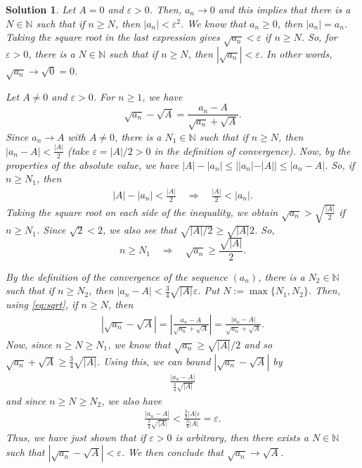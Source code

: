 \documentclass[12pt]{article}
\newcommand{\bN}{\mathbb{N}}
\newcommand{\ra}{\rightarrow}
\newcommand{\Ra}{\Rightarrow}
\theoremstyle{plain}
\theoremstyle{plain}
\newtheorem*{sol}{\textbf{Solution}}}
\theoremstyle{plain}
\theoremstyle{plain}
\begin{document}
\begin{sol}
Let $A= 0$ and $\varepsilon > 0$. Then, $a_n \ra 0$ and this implies that there is a $N \in \bN$ such that if $n \geq N$, then $|a_n| < \varepsilon^2$. We know that $a_n \geq 0$, then $|a_n| = a_n$. Taking the square root in the last expression gives $\sqrt{a_n} < \varepsilon$ if $n \geq N$. So, for $\varepsilon > 0$, there is a $N \in \bN$ such that if $n \geq N$, then $|\sqrt{a_n}| < \varepsilon$. In other words, $\sqrt{a_n} \ra \sqrt{0} = 0$.

Let $A \neq 0$ and $\varepsilon > 0$. For $n \geq 1$, we have
	\begin{equation}
	\sqrt{a_n} - \sqrt{A} = \frac{a_n - A}{\sqrt{a_n} + \sqrt{A}} .  \label{eq:sqrt}
	\end{equation}
Since $a_n \ra A$ with $A \neq 0$, there is a $N_1 \in \bN$ such that if $n \geq N$, then $|a_n - A| < \frac{|A|}{2}$ (take $\varepsilon = |A|/2 > 0$ in the definition of convergence). Now, by the properties of the absolute value, we have $|A| - |a_n| \leq ||a_n| - |A|| \leq |a_n - A|$. So, if $n \geq N_1$, then
	\begin{align*}
	|A| - |a_n| < \frac{|A|}{2} \quad \Ra \quad \frac{|A|}{2} < |a_n| .
	\end{align*}
Taking the square root on each side of the inequality, we obtain $\sqrt{a_n} > \sqrt{\frac{|A|}{2}}$ if $n \geq N_1$. Since $\sqrt{2} < 2$, we also see that $\sqrt{|A|/2} \geq \sqrt{|A|}{2}$. So, 
	\begin{equation}
	n \geq N_1 \quad \Ra \quad \sqrt{a_n} \geq \frac{\sqrt{|A|}}{2} . \label{eq:lowerbound}
	\end{equation}

By the definition of the convergence of the sequence $(a_n)$, there is a $N_2 \in \bN$ such that if $n \geq N_2$, then $|a_n - A| < \frac{3}{4} \sqrt{|A|} \varepsilon$. Put $N := \max \{ N_1 , N_2 \}$. Then, using \eqref{eq:sqrt}, if $n \geq N$, then
	\begin{align*}
	\left| \sqrt{a_n} - \sqrt{A} \right| = \left| \frac{a_n - A}{\sqrt{a_n} + \sqrt{A}} \right| = \frac{|a_n - A|}{\sqrt{a_n} + \sqrt{A}}. 
	\end{align*}
Now, since $n \geq N \geq N_1$, we know that $\sqrt{a_n} \geq \sqrt{|A|}/2$ and so $\sqrt{a_n} + \sqrt{A} \geq \frac{3}{4} \sqrt{|A|}$. Using this, we can bound $|\sqrt{a_n} - \sqrt{A}|$ by
	\begin{align*}
	\frac{|a_n - A|}{\frac{3}{4} \sqrt{|A|}}
	\end{align*}
and since $n \geq N \geq N_2$, we also have
	\begin{align*}
	\frac{|a_n - A|}{\frac{3}{4} \sqrt{|A|}} < \frac{\frac{3}{4} |A| \varepsilon}{\frac{3}{4} |A|} = \varepsilon .
	\end{align*}
Thus, we have just shown that if $\varepsilon > 0$ is arbitrary, then there exists a $N \in \bN$ such that $|\sqrt{a_n} - \sqrt{A}| < \varepsilon$. We then conclude that $\sqrt{a_n} \ra \sqrt{A}$.
\end{sol}
\end{document}
